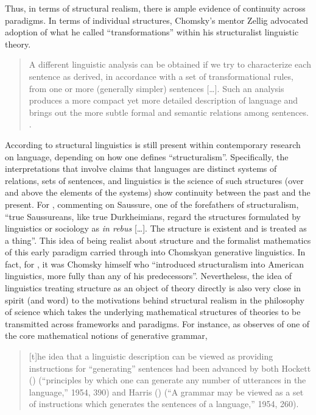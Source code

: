 \documentclass[output=paper]{langscibook}
\begin{document}
Thus, in terms of structural realism, there is ample evidence of continuity across paradigms. In terms of individual structures, Chomsky's mentor Zellig \cite{Harris1951} advocated adoption of what he called ``transformations'' within his structuralist linguistic theory. 

\begin{quote}
    A different linguistic analysis can be obtained if we try to characterize each sentence as derived, in accordance with a set of transformational rules, from one or more (generally simpler) sentences […]. Such an analysis produces a more compact yet more detailed description of language and brings out the more subtle formal and semantic relations among sentences. \citep[iv]{Harris1951}.
\end{quote}

According to \cite{Matthews2001} structural linguistics is still present within contemporary research on language, depending on how one defines ``structuralism''. Specifically, the interpretations that involve claims that languages are distinct systems of relations, sets of sentences, and linguistics is the science of such structures (over and above the elements of the systems) show continuity between the past and the present. For \cite[181]{Firth1957}, commenting on Saussure, one of the forefathers of structuralism,  ``true Saussureans, like true Durkheimians, regard the structures formulated by linguistics or sociology as \emph{in rebus} […]. The structure is existent and is treated as a thing''. This idea of being realist about structure and the formalist mathematics of this early paradigm carried through into Chomskyan generative linguistics. In fact, for \cite[26]{Joseph1999}, it was Chomsky himself who ``introduced structuralism into American linguistics, more fully than any of his predecessors''. Nevertheless, the idea of linguistics treating structure as an object of theory directly is also very close in spirit (and word) to the motivations behind structural realism in the philosophy of science which takes the underlying mathematical structures of theories to be transmitted across frameworks and paradigms. For instance, as \cite{Pullum2019} observes of one of the core mathematical notions of generative grammar, 

\begin{quote}
    [t]he idea that a linguistic description can be viewed as providing instructions for ``generating'' sentences had been advanced by both Hockett (\citeyear{Hockett54}) (``principles by which one can generate any number of utterances in the language,'' 1954, 390) and Harris (\citeyear{Harris54transfer}) (``A grammar may be viewed as a set of instructions which generates the sentences of a language,'' 1954, 260). \citep{Pullum2019}
\end{quote}
\end{document}
